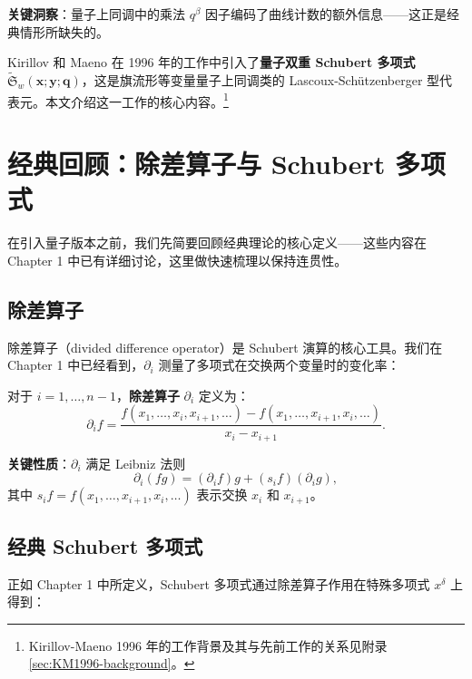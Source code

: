 \textbf{关键洞察}：量子上同调中的乘法 $q^\beta$ 因子编码了曲线计数的额外信息——这正是经典情形所缺失的。

Kirillov 和 Maeno 在 1996 年的工作中引入了\textbf{量子双重 Schubert 多项式} $\widetilde{\mathfrak{S}}_w(\mathbf{x}; \mathbf{y}; \mathbf{q})$，这是旗流形等变量量子上同调类的 Lascoux-Schützenberger 型代表元。本文介绍这一工作的核心内容。\footnote{Kirillov-Maeno 1996 年的工作背景及其与先前工作的关系见附录 \cref{sec:KM1996-background}。}

\section{经典回顾：除差算子与 Schubert 多项式}
\label{sec:ClassicalRecap}

在引入量子版本之前，我们先简要回顾经典理论的核心定义——这些内容在 Chapter 1 中已有详细讨论，这里做快速梳理以保持连贯性。

\subsection{除差算子}

除差算子（divided difference operator）是 Schubert 演算的核心工具。我们在 Chapter 1 中已经看到，$\partial_i$ 测量了多项式在交换两个变量时的变化率：

\begin{Definition}[除差算子]
\label{def:DividedDifferenceOp}
对于 $i = 1, \ldots, n-1$，\textbf{除差算子} $\partial_i$ 定义为：
\begin{equation}
\partial_i f = \frac{f(x_1,\ldots,x_i,x_{i+1},\ldots) - f(x_1,\ldots,x_{i+1},x_i,\ldots)}{x_i - x_{i+1}}.
\label{eq:DividedDifference}
\end{equation}
\end{Definition}

\textbf{关键性质}：$\partial_i$ 满足 Leibniz 法则
\begin{equation}
\partial_i(fg) = (\partial_i f)g + (s_i f)(\partial_i g),
\label{eq:LeibnizRule}
\end{equation}
其中 $s_i f = f(x_1,\ldots,x_{i+1},x_i,\ldots)$ 表示交换 $x_i$ 和 $x_{i+1}$。

\subsection{经典 Schubert 多项式}

正如 Chapter 1 中所定义，Schubert 多项式通过除差算子作用在特殊多项式 $x^\delta$ 上得到：

